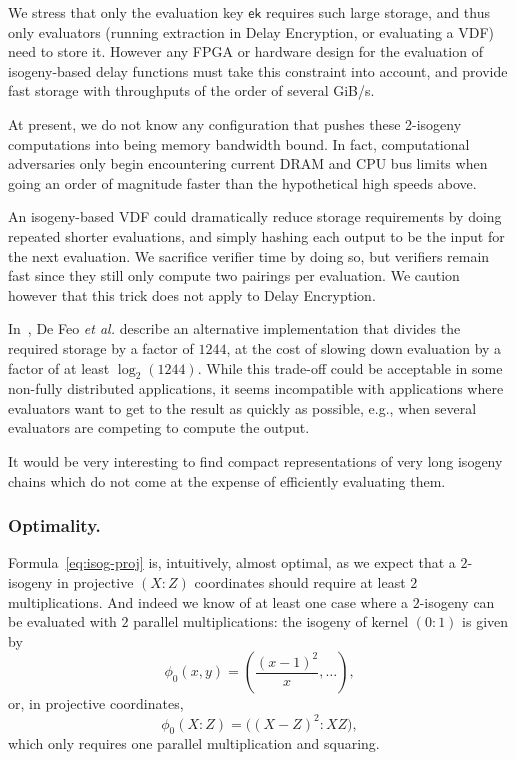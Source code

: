 \documentclass{llncs}
\newcommand{\ek}{\mathsf{ek}}
\begin{document}
We stress that only the evaluation key $\ek$ requires such large
storage, and thus only evaluators (running extraction in Delay
Encryption, or evaluating a VDF) need to store it. However any FPGA or
hardware design for the evaluation of isogeny-based delay functions
must take this constraint into account, and provide fast storage with
throughputs of the order of several GiB/s. %

At present, we do not know any configuration that pushes these
2-isogeny computations into being memory bandwidth bound. 
In fact, computational adversaries only begin encountering current
DRAM and CPU bus limits when going an order of magnitude faster
than the hypothetical high speeds above.

An isogeny-based VDF could dramatically reduce storage requirements by
doing repeated shorter evaluations, and simply hashing each output
to be the input for the next evaluation.  We sacrifice verifier time
by doing so, but verifiers remain fast since they still only compute
two pairings per evaluation.  We caution however
that this trick does not apply to Delay Encryption. 

In~\cite{10.1007/978-3-030-34578-5_10}, De Feo \emph{et al.} describe
an alternative implementation that divides the required storage by a
factor of $1244$, at the cost of slowing down evaluation by a factor
of at least $\log_2(1244)$. %
While this trade-off could be acceptable in some non-fully distributed
applications, it seems incompatible with applications where evaluators
want to get to the result as quickly as possible, e.g., when several
evaluators are competing to compute the output. %

It would be very interesting to find compact representations of very
long isogeny chains which do not come at the expense of efficiently
evaluating them.

\subsubsection{Optimality.}
Formula~\eqref{eq:isog-proj} is, intuitively, almost optimal, as we
expect that a $2$-isogeny in projective $(X:Z)$ coordinates should
require at least $2$ multiplications. %
And indeed we know of at least one case where a $2$-isogeny can be
evaluated with $2$ parallel multiplications: the isogeny of kernel
$(0:1)$ is given by
\begin{equation}
  \label{eq:isog-special}
  \phi_0(x,y) = \left(\frac{(x - 1)^2}{x}, \dots\right),
\end{equation}
or, in projective coordinates,
\begin{equation}
  \label{eq:isog-special-proj}
  \phi_0(X:Z) = \bigl((X - Z)^2:XZ\bigr),
\end{equation}
which only requires one parallel multiplication and squaring.
\end{document}
